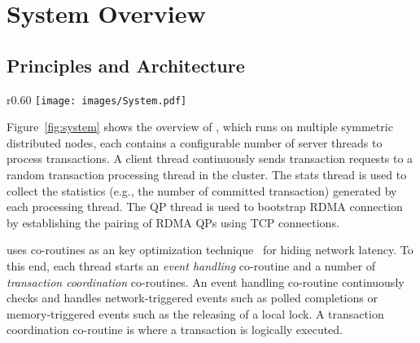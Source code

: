 \section{System Overview}

\subsection{Principles and Architecture}



\setlength{\intextsep}{2pt}%
\setlength{\columnsep}{8pt}%
\begin{wrapfigure}[10]{r}{0.60\linewidth}
    \centering
    \vspace{-0.2cm}
    \texttt{[image: images/System.pdf]}
    \vspace{-6mm}
    \caption{RCC Framework Overview}
    \vspace{-0.8cm}
    \label{fig:system}
\end{wrapfigure}
Figure~\ref{fig:system} shows the overview of 
\projectname, which runs on multiple symmetric distributed nodes,
each contains a configurable number of server threads 
to process transactions. A client thread continuously sends transaction requests to a random transaction processing thread in the cluster. The stats thread is used to collect the statistics (e.g., the number of committed transaction) generated by each processing thread. The QP thread is used to bootstrap RDMA connection by establishing the pairing of RDMA QPs using TCP connections. 

\projectname uses co-routines as an key optimization technique~\cite{kalia2016fasst} for hiding network latency. To this end, each thread starts an {\em event handling} co-routine and a number of {\em transaction coordination} co-routines. An event handling co-routine continuously checks and handles network-triggered events such as polled completions or {memory-triggered events} such as the releasing of a local lock. A transaction coordination co-routine is where a transaction is logically executed.

